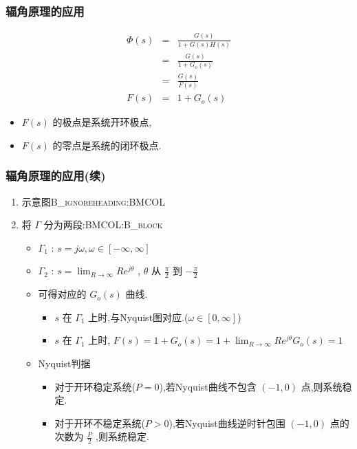 \documentclass[table]{article}
\begin{document}
\subsubsection{辐角原理的应用}
\label{sec:orgd602d17}
\begin{eqnarray*}
\Phi(s) &= &\frac{G(s)}{1+G(s)H(s)} \\
       &=&\frac{G(s)}{1+G_o(s)} \\
       &=&\frac{G(s)}{F(s)} \\
 F(s)&=&1+G_o(s)
\end{eqnarray*}
\begin{itemize}
\item \(F(s)\)  的极点是系统开环极点,
\item \(F(s)\)  的零点是系统的闭环极点.
\end{itemize}

\subsubsection{辐角原理的应用(续)}
\label{sec:org7d043d0}
\begin{enumerate}
\item 示意图\hfill{}\textsc{B\_ignoreheading:BMCOL}
\label{sec:orgb1a9cc7}

\item 将 \(\Gamma\) 分为两段:\hfill{}\textsc{BMCOL:B\_block}
\label{sec:org99dae01}
\begin{itemize}
\item \(\Gamma_1\) : \(s=j\omega,\omega\in[-\infty,\infty]\)
\item \(\Gamma_2\) : \(s=\lim_{R\rightarrow\infty}Re^{j\theta}\) , \(\theta\) 从 \(\frac{\pi}{2}\) 到 \(-\frac{\pi}{2}\)
\item 可得对应的 \(G_o(s)\) 曲线.
\begin{itemize}
\item \(s\) 在 \(\Gamma_1\) 上时,与Nyquist图对应.(\(\omega\in[0,\infty]\))
\item \(s\) 在 \(\Gamma_1\) 上时, \(F(s)=1+G_o(s)=1+\lim_{R\rightarrow\infty}Re^{j\theta}G_o(s)=1\)
\end{itemize}
\item <3-> Nyquist判据
\begin{itemize}
\item 对于开环稳定系统(\(P=0\)),若Nyquist曲线不包含 \((-1,0)\) 点,则系统稳定.
\item 对于开环不稳定系统(\(P>0\)),若Nyquist曲线逆时针包围 \((-1,0)\) 点的次数为 \(\frac{P}{2}\) ,则系统稳定.
\end{itemize}
\end{itemize}
\end{enumerate}
\end{document}
